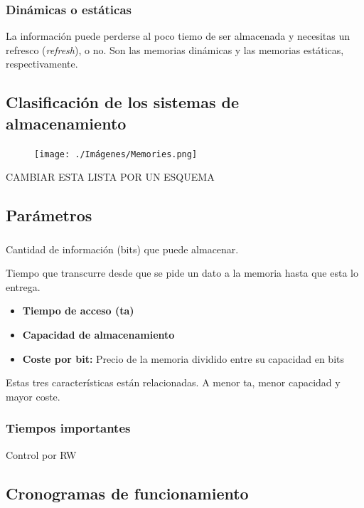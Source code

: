 \documentclass[a4paper]{book}
\begin{document}
\subsubsection{Dinámicas o estáticas}
La información puede perderse al poco tiemo de ser almacenada y necesitas un refresco (\textit{refresh}), o no. Son las memorias dinámicas y las memorias estáticas, respectivamente.

\subsection{Clasificación de los sistemas de almacenamiento}

\begin{figure}[t!]
	\centering
		\texttt{[image: ./Imágenes/Memories.png]}
\end{figure}

CAMBIAR ESTA LISTA POR UN ESQUEMA

\subsection{Parámetros}
\subsubsection{}
Cantidad de información (bits) que puede almacenar.


Tiempo que transcurre desde que se pide un dato a la memoria hasta que esta lo entrega.

\begin{itemize}
	 \item \textbf{Tiempo de acceso (ta)}
	 \item \textbf{Capacidad de almacenamiento}
	 \item \textbf{Coste por bit:} Precio de la memoria dividido entre su capacidad en bits
\end{itemize}

Estas tres características están relacionadas.
A menor ta, menor capacidad y mayor coste.

\subsubsection{Tiempos importantes}


Control por RW


\subsection{Cronogramas de funcionamiento}
\end{document}
